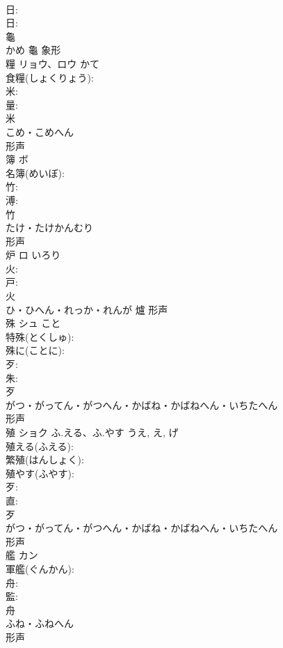 \documentclass[8pt]{extreport}
\begin{document}
\begin{CJK}{UTF8}{min}
\\	日: 
\\	日: 
\\	龜	
\\	かめ	龜	象形 
\\	糧	リョウ、ロウ	かて		
\\	食糧(しょくりょう): 
\\	米: 
\\	量: 
\\	米	
\\	こめ・こめへん	
\\	形声 
\\	簿	ボ			
\\	名簿(めいぼ): 
\\	竹: 
\\	溥: 
\\	竹	
\\	たけ・たけかんむり	
\\	形声 
\\	炉	ロ	いろり		
\\	火: 
\\	戸: 
\\	火	
\\	ひ・ひへん・れっか・れんが	爐	形声 
\\	殊	シュ	こと		
\\	特殊(とくしゅ): 
\\	殊に(ことに): 
\\	歹: 
\\	朱: 
\\	歹	
\\	がつ・がってん・がつへん・かばね・かばねへん・いちたへん	
\\	形声 
\\	殖	ショク	ふ.える、ふ.やす	うえ, え, げ	
\\	殖える(ふえる): 
\\	繁殖(はんしょく): 
\\	殖やす(ふやす): 
\\	歹: 
\\	直: 
\\	歹	
\\	がつ・がってん・がつへん・かばね・かばねへん・いちたへん	
\\	形声 
\\	艦	カン			
\\	軍艦(ぐんかん): 
\\	舟: 
\\	監: 
\\	舟	
\\	ふね・ふねへん	
\\	形声 

\end{CJK}
\end{document}
